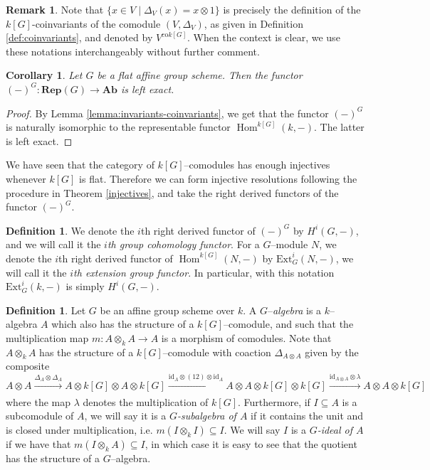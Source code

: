 \documentclass{article}
\theoremstyle{plain}
\newtheorem{Cor}[Th]{Corollary}
\theoremstyle{definition}
\newtheorem{Def}[Th]{Definition}
\newtheorem{Rem}[Th]{Remark}
\DeclareMathOperator{\Hom}{Hom}
\begin{document}
\begin{Rem}
    Note that $\{x \in V \mid \Delta_V(x) = x \otimes 1\}$ is precisely the definition of the $k[G]$-coinvariants of the comodule $(V, \Delta_V)$, as given in Definition \ref{def:coinvariants}, and denoted by $V^{\mathrm{co}k[G]}$. When the context is clear, we use these notations interchangeably without further comment.
\end{Rem}

\begin{Cor}
    Let $G$ be a flat affine group scheme. Then the functor $(-)^G\colon \mathbf{Rep}(G)\to \mathbf{Ab}$ is left exact. 
\end{Cor}
\begin{proof}
   By Lemma \ref{lemma:invariants-coinvariants},  we get that the functor $(-)^G$ is naturally isomorphic to the representable functor $\Hom^{k[G]}(k, -)$. The latter  is left exact.
\end{proof}

We have seen that the category of $k[G]$--comodules has enough injectives whenever $k[G]$ is flat. Therefore we can form injective resolutions following the procedure in Theorem \ref{injectives}, and take the right derived functors of the functor $(-)^G$. 

\begin{Def}
    We denote the $i$th right derived functor of $(-)^G$ by $H^i(G, -)$, and we will call it the $i$\textit{th group cohomology functor}. For a $G$--module $N$, we denote the $i$th right derived functor of $\Hom^{k[G]}(N,-)$ by $\mathrm{Ext}_G^i(N,-)$, we will call it the $i$\textit{th extension group functor}. In particular, with this notation $\mathrm{Ext}^i_G(k,-)$ is simply $H^i(G,-)$.
\end{Def}



\begin{Def}
    Let $G$ be an affine group scheme over $k$. A $G$--\textit{algebra} is a $k$--algebra $A$ which also has the structure of a $k[G]$--comodule, and such that the multiplication map $m\colon A\otimes_k A\to A$ is a morphism of comodules. Note that $A\otimes_k A$ has the structure of a $k[G]$--comodule with coaction $\Delta_{A\otimes A}$ given by the composite 
    \[
     A\otimes A \xrightarrow{\Delta_A \otimes \Delta_A} A\otimes k[G] \otimes A\otimes k[G] \xrightarrow[]{\mathrm{id}_A\otimes(12) \otimes \mathrm{id}_A} A\otimes A \otimes k[G]\otimes k[G]\xrightarrow[]{\mathrm{id}_{A\otimes A}\otimes \lambda} A\otimes A\otimes k[G]
    \]
    where the map $\lambda$ denotes the multiplication of $k[G]$.  Furthermore, if $I \subseteq A$ is a subcomodule of $A$, we will say it is a $G$\textit{-subalgebra of $A$} if it contains the unit and is closed under multiplication, i.e. $m(I\otimes_k I) \subseteq I$. We will say $I$ is a $G$\textit{-ideal of $A$} if we have that $m(I\otimes_k A) \subseteq I$, in which case it is easy to see that the quotient has the structure of a $G$--algebra.
\end{Def}
\end{document}
